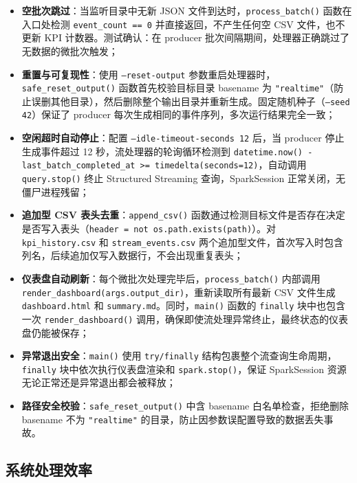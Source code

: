 \documentclass[12pt,hyperref,a4paper,UTF8]{ctexart}
\begin{document}
\begin{itemize}
    \item \textbf{空批次跳过}：当监听目录中无新 JSON 文件到达时，\texttt{process\_batch()} 函数在入口处检测 \texttt{event\_count == 0} 并直接返回，不产生任何空 CSV 文件，也不更新 KPI 计数器。测试确认：在 producer 批次间隔期间，处理器正确跳过了无数据的微批次触发；
    \item \textbf{重置与可复现性}：使用 \texttt{--reset-output} 参数重启处理器时，\texttt{safe\_reset\_output()} 函数首先校验目标目录 basename 为 \texttt{"realtime"}（防止误删其他目录），然后删除整个输出目录并重新生成。固定随机种子（\texttt{--seed 42}）保证了 producer 每次生成相同的事件序列，多次运行结果完全一致；
    \item \textbf{空闲超时自动停止}：配置 \texttt{--idle-timeout-seconds 12} 后，当 producer 停止生成事件超过 12 秒，流处理器的轮询循环检测到 \texttt{datetime.now() - last\_batch\_completed\_at >= timedelta(seconds=12)}，自动调用 \texttt{query.stop()} 终止 Structured Streaming 查询，SparkSession 正常关闭，无僵尸进程残留；
    \item \textbf{追加型 CSV 表头去重}：\texttt{append\_csv()} 函数通过检测目标文件是否存在决定是否写入表头（\texttt{header = not os.path.exists(path)}）。对 \texttt{kpi\_history.csv} 和 \texttt{stream\_events.csv} 两个追加型文件，首次写入时包含列名，后续追加仅写入数据行，不会出现重复表头；
    \item \textbf{仪表盘自动刷新}：每个微批次处理完毕后，\texttt{process\_batch()} 内部调用 \texttt{render\_dashboard(args.output\_dir)}，重新读取所有最新 CSV 文件生成 \texttt{dashboard.html} 和 \texttt{summary.md}。同时，\texttt{main()} 函数的 \texttt{finally} 块中也包含一次 \texttt{render\_dashboard()} 调用，确保即使流处理异常终止，最终状态的仪表盘仍能被保存；
    \item \textbf{异常退出安全}：\texttt{main()} 使用 \texttt{try/finally} 结构包裹整个流查询生命周期，\texttt{finally} 块中依次执行仪表盘渲染和 \texttt{spark.stop()}，保证 SparkSession 资源无论正常还是异常退出都会被释放；
    \item \textbf{路径安全校验}：\texttt{safe\_reset\_output()} 中含 basename 白名单检查，拒绝删除 basename 不为 \texttt{"realtime"} 的目录，防止因参数误配置导致的数据丢失事故。
\end{itemize}

\subsection{系统处理效率}
\end{document}
